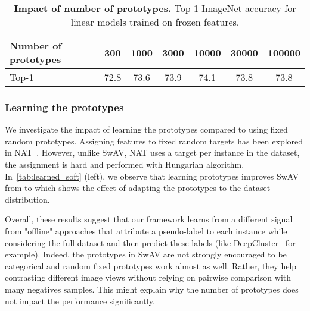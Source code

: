 \documentclass{article}
\def\OURS{SwAV\xspace}
\begin{document}
\begin{table}[h]
\centering
  \caption{
\textbf{Impact of number of prototypes.} Top-1 ImageNet accuracy for linear models trained on frozen features.
}
\vspace{.3em}
\begin{tabular}{l c c c c c c}
    \toprule
	  Number of prototypes & 300 & 1000 & 3000 & 10000 & 30000 & 100000 \\
    \midrule
	Top-1 & 72.8 & 73.6 & 73.9 & 74.1 & 73.8 & 73.8 \\
    \bottomrule
  \end{tabular}
  \label{tab:nmbproto}
\end{table}

\subsubsection{Learning the prototypes}
We investigate the impact of learning the prototypes compared to using fixed random prototypes.
Assigning features to fixed random targets has been explored in NAT~\cite{bojanowski2017unsupervised}.
However, unlike \OURS, NAT uses a target per instance in the dataset, the assignment is hard and performed with Hungarian algorithm.
In~\cref{tab:learned_soft} (left), we observe that learning prototypes improves \OURS from  to  which shows the effect of adapting the prototypes to the dataset distribution.

Overall, these results suggest that our framework learns from a different signal from "offline" approaches that attribute a pseudo-label to each instance while considering the full dataset and then predict these labels (like DeepCluster~\cite{caron2018deep} for example). 
Indeed, the prototypes in \OURS are not strongly encouraged to be categorical and random fixed prototypes work almost as well.
Rather, they help contrasting different image views without relying on pairwise comparison with many negatives samples.
This might explain why the number of prototypes does not impact the performance significantly.
\end{document}
